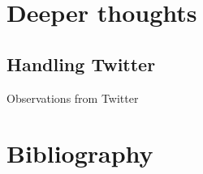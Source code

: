 \documentclass[compress]{beamer}
\begin{document}
\section{Deeper thoughts}
\subsection{Handling Twitter}
\begin{frame}{Observations from Twitter}
\end{frame}

\section{Bibliography}

\begin{frame}


\end{frame}
\end{document}

